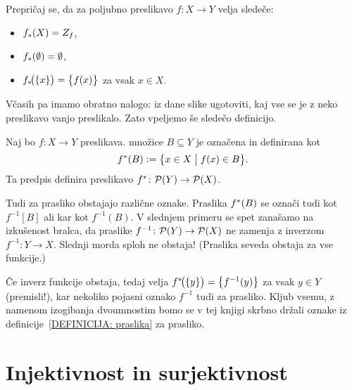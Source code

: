 		\begin{vaja}
			Prepričaj se, da za poljubno preslikavo $f\colon X \to Y$ velja sledeče:
			\begin{itemize}
				\item
					$\img{f}{X} = Z_f$,
				\item
					$\img{f}{\emptyset} = \emptyset$,
				\item
					$\img[1]{f}{\set{x}} = \set[1]{f(x)}$ za vsak $x \in X$.
			\end{itemize}
		\end{vaja}
		
		
		Včasih pa imamo obratno nalogo: iz dane slike ugotoviti, kaj vse se je z neko preslikavo vanjo preslikalo. Zato vpeljemo še sledečo definicijo.
		
		\begin{definicija}\label{DEFINICIJA: praslika}
			Naj bo $f\colon X \to Y$ preslikava.  množice $B \subseteq Y$ je označena in definirana kot
			\[\pim{f}{B} \dfeq \set[1]{x \in X}{f(x) \in B}.\]
			Ta predpis definira preslikavo $\pim{f}\colon \pst(Y) \to \pst(X)$.
		\end{definicija}
		
		\begin{opomba}
			Tudi za prasliko obstajajo različne oznake. Praslika $\pim{f}{B}$ se označi tudi kot $f^{-1}[B]$ ali kar kot $f^{-1}(B)$. V slednjem primeru se spet zanašamo na izkušenost bralca, da praslike $f^{-1}\colon \mathcal{P}(Y) \to \mathcal{P}(X)$ ne zamenja z inverzom $f^{-1}\colon Y \to X$. Slednji morda sploh ne obstaja! (Praslika seveda obstaja za vse funkcije.)
			
			Če inverz funkcije obstaja, tedaj velja $\pim[1]{f}{\set{y}} = \set[1]{f^{-1}(y)}$ za vsak $y \in Y$ (premisli!), kar nekoliko pojasni oznako $f^{-1}$ tudi za prasliko. Kljub vsemu, z namenom izogibanja dvoumnostim bomo se v tej knjigi skrbno držali oznake iz definicije~\ref{DEFINICIJA: praslika} za prasliko.
		\end{opomba}
		
		
	
	
	\section{Injektivnost in surjektivnost}\label{RAZDELEK: Injektivnost in surjektivnost}
	
